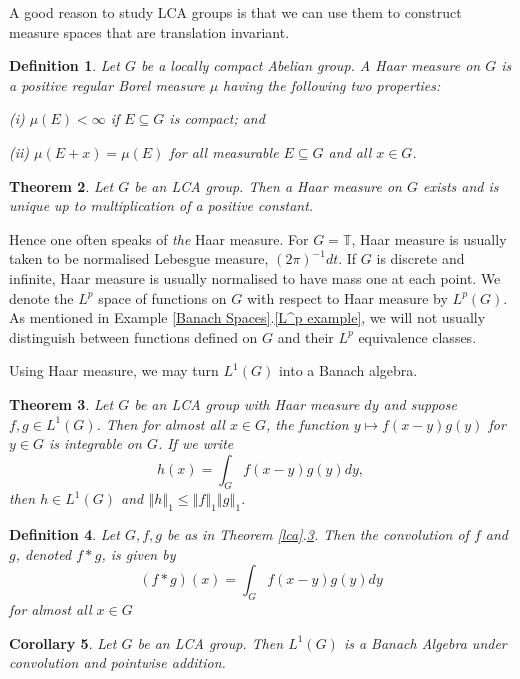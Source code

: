\documentclass[honours,12pt]{unswthesis}
\newcommand{\T}{\mathbb{T}}
\newcommand{\reff}[2]{\ref{#1}.\ref{#2}}
\def\norm#1{\left \Vert #1 \right \Vert}
\newtheorem{theorem}{Theorem}[section]
\newtheorem{corollary}[theorem]{Corollary}
\newtheorem{definition}[theorem]{Definition}
\numberwithin{equation}{section}
\begin{document}
A good reason to study LCA groups is
that we can use them to construct measure spaces that are translation invariant.

\begin{definition} Let $G$ be a locally compact Abelian group. A {\em Haar
measure} on $G$ is a positive regular Borel measure $\mu$ having the
following two properties:

(i) $\mu(E)<\infty$ if $E\subseteq G$ is compact; and

(ii) $\mu(E+x)=\mu(E)$ for all measurable $E\subseteq G$ and all $x\in G$.
\end{definition}

\begin{theorem}\cite[Chapter VII, \S 2]{Katznelson}
Let $G$ be an LCA group. Then a Haar measure on $G$ exists and is unique up to
multiplication of a positive constant.
\end{theorem}

Hence one often speaks of {\em the} Haar measure. For $G=\T$, Haar measure is
usually taken to be normalised
Lebesgue measure, $(2\pi)^{-1}dt$. If $G$ is discrete and infinite, Haar measure
is usually
normalised to have mass one at each point. We denote the $L^p$ space of
functions on $G$ with respect to Haar measure by $L^p(G)$. As mentioned in
Example \reff{Banach Spaces}{L^p example}, we will not usually distinguish
between functions defined on $G$ and their $L^p$ equivalence classes.

Using Haar measure, we may turn $L^1(G)$ into a Banach algebra.

\begin{theorem}\label{convolution}
Let $G$ be an LCA group with Haar measure $dy$
and suppose $f,g\in L^1(G)$. Then for almost all $x\in G$, the function
$y\mapsto f(x-y)g(y)$ for $y\in G$ is integrable on $G$.
If we write 
\[h(x)=\int_G f(x-y)g(y)dy,\]
then $h\in L^1(G)$ and $\norm{h}_1\leq\norm{f}_1\norm{g}_1$.
\end{theorem}

\begin{definition} Let $G,f,g$ be as in Theorem \reff{lca}{convolution}. Then
the {\em convolution} of $f$ and $g$, denoted $f*g$, is given by
\[(f*g)(x)=\int_G f(x-y)g(y)dy\]
for almost all $x\in G$
\end{definition}

\begin{corollary} Let $G$ be an LCA group. Then $L^1(G)$ is a
Banach Algebra under convolution and pointwise addition.
\end{corollary}
\end{document}
